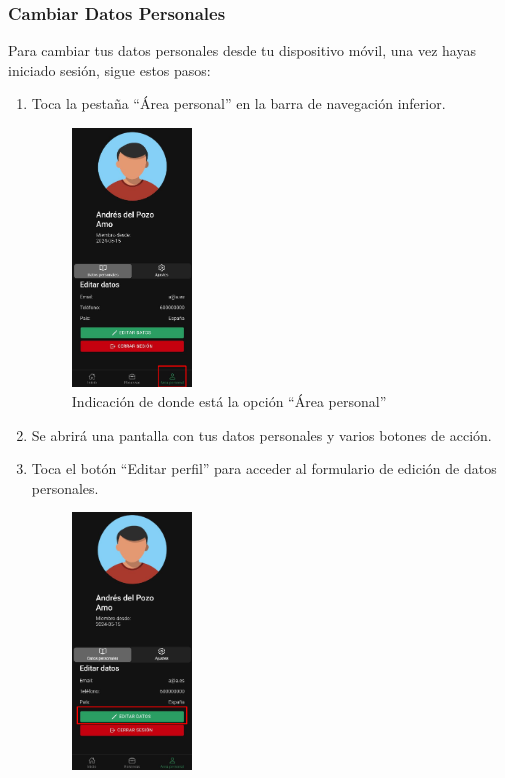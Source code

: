 \subsubsection{Cambiar Datos Personales}
Para cambiar tus datos personales desde tu dispositivo móvil, una vez hayas iniciado sesión, sigue estos pasos:
\begin{enumerate}
	\item Toca la pestaña “Área personal” en la barra de navegación inferior.
	      \begin{figure}[H]
		      \centering
		      \includegraphics[width=0.3\textwidth]{7-Construccion/Manuales/app/P1-Perfil.png}
		      \caption{Indicación de donde está la opción “Área personal” }
	      \end{figure}
	\item Se abrirá una pantalla con tus datos personales y varios botones de acción.
	\item Toca el botón “Editar perfil” para acceder al formulario de edición de datos personales.
	      \begin{figure}[H]
		      \centering
		      \includegraphics[width=0.3\textwidth]{7-Construccion/Manuales/app/P2-Perfil.png}

\end{figure}
\end{enumerate}
